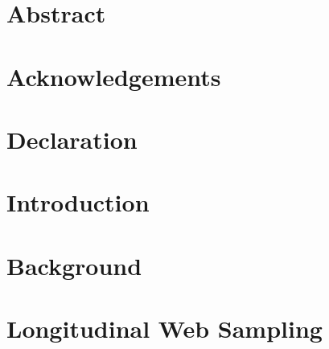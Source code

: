 \documentclass[10pt,oneside,a4paper,onecolumn,titlepage,draft]{lancsthesis}
\begin{document}
\frontmatter








\chapter*{Abstract}


\chapter*{Acknowledgements}


\chapter*{Declaration}


\tableofcontents
\listoffigures
\listoftables
\clearpage



\mainmatter


\chapter{Introduction}
\label{sec:introduction}




\chapter{Background}
\label{sec:litreview}



\chapter{Longitudinal Web Sampling}
\label{sec:longitudinal}

\end{document}
